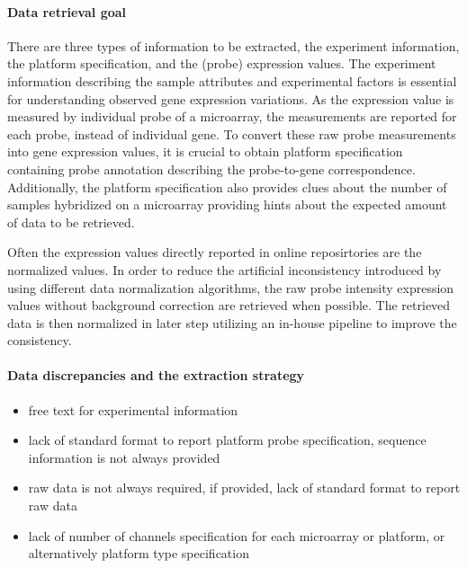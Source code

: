 \paragraph{Data retrieval goal}
%
There are three types of information to be extracted, the experiment
information, the platform specification, and the (probe) expression
values.
%
 The experiment
information describing the sample attributes and experimental factors is
essential for understanding observed gene expression variations.
%
%
As the expression value is measured by individual probe of a microarray,
the measurements are reported for each probe, instead of individual gene.
%
To convert these raw probe measurements into gene expression values, it
is crucial to obtain platform specification containing probe annotation
describing the probe-to-gene correspondence.
%
Additionally, the platform specification also provides clues about the
number of samples hybridized on a microarray providing hints about the
expected amount of data to be retrieved.


Often the expression values directly reported in online reposirtories are
the normalized values.
%
In order to reduce the artificial inconsistency introduced by using
different data normalization algorithms, the raw probe intensity
expression values without background correction are retrieved when
possible.
%
The retrieved data is then normalized in later step utilizing an in-house
pipeline to improve the consistency.




\paragraph{Data discrepancies and the extraction strategy}

\begin{itemize}
\item free text for experimental information
\item lack of standard format to report platform probe specification,
  sequence information is not always provided
\item raw data is not always required, if provided, lack of standard
  format to report raw data
\item lack of number of channels specification for each microarray or
  platform, or alternatively platform type specification
\end{itemize}


